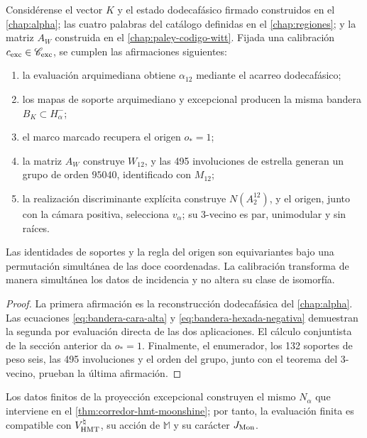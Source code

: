 \begin{theorem}
Considérense el vector \(K\) y el estado dodecafásico firmado construidos en
el \cref{chap:alpha}; las cuatro palabras del catálogo definidas en el
\cref{chap:regiones}; y la matriz \(A_W\) construida en el
\cref{chap:paley-codigo-witt}. Fijada una calibración
\(c_{\rm exc}\in\mathscr C_{\rm exc}\), se cumplen las afirmaciones
siguientes:
\begin{enumerate}
  \item la evaluación arquimediana obtiene \(\alpha_{12}\) mediante el acarreo
  dodecafásico;
  \item los mapas de soporte arquimediano y excepcional producen la misma bandera
  \(B_K\subset H^-_\alpha\);
  \item el marco marcado recupera el origen \(o_*=1\);
  \item la matriz \(A_W\) construye \(W_{12}\), y las 495 involuciones de
  estrella generan un grupo de orden \(95040\), identificado con \(M_{12}\);
  \item la realización discriminante explícita construye \(N(A_2^{12})\),
  y el origen, junto con la cámara positiva, selecciona \(v_\alpha\); su
  3-vecino es par, unimodular y sin raíces.
\end{enumerate}
Las identidades de soportes y la regla del origen son equivariantes bajo una
permutación simultánea de las doce coordenadas. La calibración transforma de
manera simultánea los datos de incidencia y no altera su clase de isomorfía.
\end{theorem}

\begin{proof}
La primera afirmación es la reconstrucción dodecafásica del
\cref{chap:alpha}. Las ecuaciones
\eqref{eq:bandera-cara-alta} y \eqref{eq:bandera-hexada-negativa} demuestran
la segunda por evaluación directa de las dos aplicaciones. El cálculo conjuntista
de la sección anterior da \(o_*=1\). Finalmente, el enumerador, los 132
soportes de peso seis, las 495 involuciones y el orden del grupo, junto con el
teorema del 3-vecino, prueban la última afirmación.
\end{proof}

\begin{corollary}
Los datos finitos de la proyección excepcional construyen el mismo
\(N_\alpha\) que interviene en el
\cref{thm:corredor-hmt-moonshine}; por tanto, la evaluación finita es
compatible con \(V^\natural_{\rm HMT}\), su acción de \(\mathbb M\) y su
carácter \(J_{\rm Mon}\).
\end{corollary}

